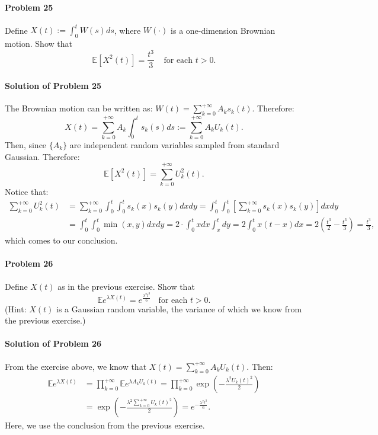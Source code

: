 \documentclass{article}
\begin{document}
\paragraph{Problem 25} Define $X(t):=\int_0^t W(s)ds$, where $W(\cdot)$ is a one-dimension Brownian motion. Show that 
\[\mathbb{E}[X^2(t)]=\frac{t^3}{3}~~~~~\text{for each }t>0.\]

\paragraph{Solution of Problem 25} The Brownian motion can be written as: $W(t)=\sum_{k=0}^{+\infty} A_k s_k(t)$. Therefore:
\[X(t)=\sum_{k=0}^{+\infty}A_k \int_0^t s_k(s)ds:=\sum_{k=0}^{+\infty}A_k U_k(t).\]
Then, since $\{A_k\}$ are independent random variables sampled from standard Gaussian. Therefore:
\[\mathbb{E}[X^2(t)]=\sum_{k=0}^{+\infty} U_k^2(t).\]
Notice that:
\begin{equation*}
\begin{aligned}
\sum_{k=0}^{+\infty} U_k^2(t) &= \sum_{k=0}^{+\infty}\int_0^t\int_0^t s_k(x)s_k(y)dxdy = \int_0^t\int_0^t \left[\sum_{k=0}^{+\infty}s_k(x)s_k(y)\right]dxdy\\
&= \int_0^t\int_0^t\min(x,y)dxdy = 2\cdot\int_0^t xdx\int_x^t dy = 2\int_0^t x(t-x)dx= 2\left(\frac{t^3}{2}-\frac{t^3}{3}\right)=\frac{t^3}{3},
\end{aligned}    
\end{equation*}
which comes to our conclusion.


\paragraph{Problem 26} Define $X(t)$ as in the previous exercise. Show that 
\[\mathbb{E}e^{\lambda X(t)}=e^{\frac{\lambda^2 t^3}{6}}~~~~\text{for each }t>0.\]
(Hint: $X(t)$ is a Gaussian random variable, the variance of which we know from the previous exercise.)

\paragraph{Solution of Problem 26} From the exercise above, we know that $X(t)=\sum_{k=0}^{+\infty}A_k U_k(t)$. Then:
\begin{equation*}
\begin{aligned}
\mathbb{E}e^{\lambda X(t)}&=\prod_{k=0}^{+\infty}\mathbb{E} e^{\lambda A_k U_k(t)} = \prod_{k=0}^{+\infty}\exp\left(-\frac{\lambda^2 U_k(t)^2}{2}\right)\\
&= \exp\left(-\frac{\lambda^2 \sum_{k=0}^{+\infty}U_k(t)^2}{2}\right) = e^{-\frac{\lambda^2 t^3}{6}}.
\end{aligned}    
\end{equation*}
Here, we use the conclusion from the previous exercise. 
\end{document}
